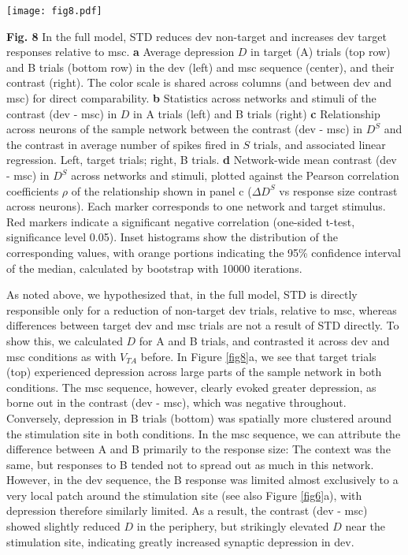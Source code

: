 \documentclass[pdflatex,referee,iicol,sn-basic]{sn-jnl}
\theoremstyle{thmstyleone}%
\theoremstyle{thmstyletwo}%
\theoremstyle{thmstylethree}%
\begin{document}
\begin{figure*}%
    \centering
    \texttt{[image: fig8.pdf]}
    \caption{}
    \label{fig8}
\end{figure*}
\textbf{Fig. 8} In the full model, STD reduces dev non-target and increases dev target responses relative to msc.
\textbf{a} Average depression $D$ in target (A) trials (top row) and B trials (bottom row) in the dev (left) and msc sequence (center), and their contrast (right). The color scale is shared across columns (and between dev and msc) for direct comparability.
\textbf{b} Statistics across networks and stimuli of the contrast (dev - msc) in $D$ in A trials (left) and B trials (right)
\textbf{c} Relationship across neurons of the sample network between the contrast (dev - msc) in $D^S$ and the contrast in average number of spikes fired in $S$ trials, and associated linear regression. Left, target trials; right, B trials.
\textbf{d} Network-wide mean contrast (dev - msc) in $D^S$ across networks and stimuli, plotted against the Pearson correlation coefficients $\rho$ of the relationship shown in panel c ($\Delta D^S$ vs response size contrast across neurons). Each marker corresponds to one network and target stimulus. Red markers indicate a significant negative correlation (one-sided t-test, significance level 0.05). Inset histograms show the distribution of the corresponding values, with orange portions indicating the 95\% confidence interval of the median, calculated by bootstrap with 10000 iterations.

As noted above, we hypothesized that, in the full model, STD is directly responsible only for a reduction of non-target dev trials, relative to msc, whereas differences between target dev and msc trials are not a result of STD directly. To show this, we calculated $D$ for A and B trials, and contrasted it across dev and msc conditions as with $V_{TA}$ before.
In Figure \ref{fig8}a, we see that target trials (top) experienced depression across large parts of the sample network in both conditions. The msc sequence, however, clearly evoked greater depression, as borne out in the contrast (dev - msc), which was negative throughout. Conversely, depression in B trials (bottom) was spatially more clustered around the stimulation site in both conditions. In the msc sequence, we can attribute the difference between A and B primarily to the response size: The context was the same, but responses to B tended not to spread out as much in this network. However, in the dev sequence, the B response was limited almost exclusively to a very local patch around the stimulation site (see also Figure \ref{fig6}a), with depression therefore similarly limited. As a result, the contrast (dev - msc) showed slightly reduced $D$ in the periphery, but strikingly elevated $D$ near the stimulation site, indicating greatly increased synaptic depression in dev.
\end{document}
